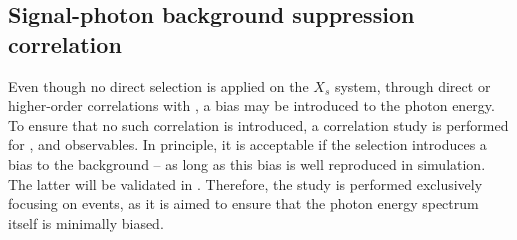 \subsection{Signal-photon background suppression correlation}\label{sec:signal_photon_correlation}

Even though no direct selection is applied on the $X_s$ system, through direct or higher-order correlations with \EB, a bias may be introduced to the photon energy.
To ensure that no such correlation is introduced, a correlation study is performed for \piVeto, \etaVeto and \ZMVA observables.
In principle, it is acceptable if the selection introduces a bias to the background -- as long as this bias is well reproduced in simulation.
The latter will be validated in .
Therefore, the study is performed exclusively focusing on \BtoXsgamma events, as it is aimed to ensure that the photon energy spectrum itself is minimally biased.

